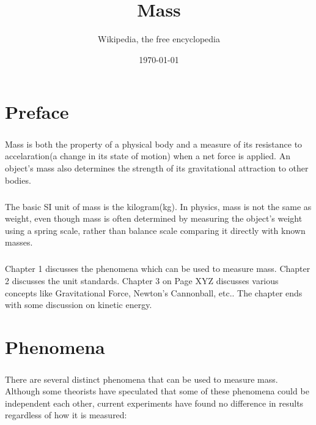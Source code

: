 \documentclass{book}
\title{Mass}
\author{Wikipedia, the free encyclopedia}
\date{\today}
\begin{document}
	\maketitle
	
	\chapter*{Preface}
	\paragraph{}
	
	Mass is both the property of a physical body and a measure of its resistance to accelaration(a change in its state of motion) when a net force is applied. An object's mass also determines the strength of its gravitational attraction to other bodies.
	
	\paragraph{}
	The basic SI unit of mass is the kilogram(kg). In physics, mass is not the same as weight, even though mass is often determined by measuring the object's weight using a spring scale, rather than balance scale comparing it directly with known masses.
	
	\paragraph{}
	Chapter 1 discusses the phenomena which can be used to measure mass. Chapter 2 discusses the unit standards. Chapter 3 on Page XYZ discusses various concepts like Gravitational Force, Newton's Cannonball, etc.. The chapter ends with some discussion on kinetic energy.
	
	\tableofcontents
	
	\chapter{Phenomena}
	\paragraph{}
	
	There are several distinct phenomena that can be used to measure mass. Although some theorists have speculated that some of these phenomena could be independent each other, current experiments have found no difference in results regardless of how it is measured:
	
\end{document}
